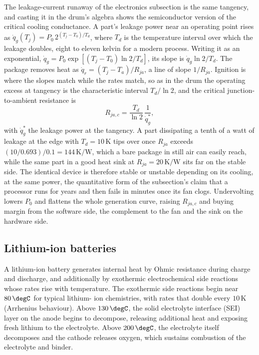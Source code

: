 \begin{mastery}
The leakage-current runaway of the electronics subsection is the same
tangency, and casting it in the drum's algebra shows the semiconductor
version of the critical cooling conductance. A part's leakage power near an
operating point rises as $\dot{q}_g(T_j) = P_0\,2^{(T_j - T_0)/T_d}$, where
$T_d$ is the temperature interval over which the leakage doubles, eight to
eleven kelvin for a modern process. Writing it as an exponential,
$\dot{q}_g = P_0\exp[(T_j - T_0)\ln 2/T_d]$, its slope is $\dot{q}_g\ln
2/T_d$. The package removes heat as $\dot{q}_r = (T_j - T_a)/R_{ja}$, a line
of slope $1/R_{ja}$. Ignition is where the slopes match while the rates
match, so as in the drum the operating excess at tangency is the
characteristic interval $T_d/\ln 2$, and the critical junction-to-ambient
resistance is
\[
R_{ja,c} = \frac{T_d}{\ln 2}\,\frac{1}{\dot{q}_g^*},
\]
with $\dot{q}_g^*$ the leakage power at the tangency. A part dissipating a
tenth of a watt of leakage at the edge with $T_d = 10\,\si{\kelvin}$ tips
over once $R_{ja}$ exceeds $(10/0.693)/0.1 = 144\,\si{\kelvin}/\text{W}$,
which a bare package in still air can easily reach, while the same part in a
good heat sink at $R_{ja} = 20\,\si{\kelvin}/\text{W}$ sits far on the
stable side. The identical device is therefore stable or unstable depending
on its cooling, at the same power, the quantitative form of the
subsection's claim that a processor runs for years and then fails in minutes
once its fan clogs. Undervolting lowers $P_0$ and flattens the whole
generation curve, raising $R_{ja,c}$ and buying margin from the software
side, the complement to the fan and the sink on the hardware side.
\end{mastery}

\subsection{Lithium-ion batteries}

A lithium-ion battery generates internal heat by Ohmic resistance
during charge and discharge, and additionally by exothermic
electrochemical side reactions whose rates rise with temperature. The
exothermic side reactions begin near $80\,\degC$ for typical lithium-
ion chemistries, with rates that double every $10\,\si{\kelvin}$
(Arrhenius behaviour). Above $130\,\degC$, the solid electrolyte
interface (SEI) layer on the anode begins to decompose, releasing
additional heat and exposing fresh lithium to the electrolyte.
Above $200\,\degC$, the electrolyte itself decomposes and the
cathode releases oxygen, which sustains combustion of the
electrolyte and binder.

